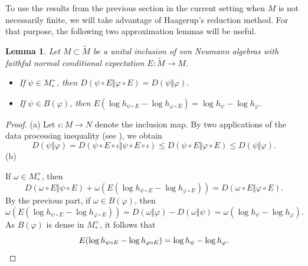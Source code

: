 \documentclass[12pt,a4paper]{amsart}
\newcommand{\1}{\mathds{1}}
\renewcommand{\phi}{\varphi}
\renewcommand{\L}{\mathcal L}
\newcommand{\dom}{\operatorname{dom}}
\theoremstyle{plain}
\newtheorem{lemma}[proposition]{Lemma}
\theoremstyle{definition}
\theoremstyle{remark}
\begin{document}
To use the results from the previous section in the current setting when $M$ is not necessarily finite, we will take advantage of Haagerup's reduction method. For that purpose, the following two approximation lemmas will be useful.

\begin{lemma}\label{lem:entropy_extension}
Let $M\subset \tilde M$ be a unital inclusion of von Neumann algebras with faithful normal conditional expectation $E\colon \tilde M\to M$.
\begin{itemize}
\item[(a)] If $\psi\in M_\ast^+$, then $D(\psi\circ E\Vert \phi\circ E)=D(\psi\Vert \phi)$.

\item[(b)]If $\psi\in B(\phi)$, then $E(\log h_{\psi\circ E}-\log h_{\phi\circ E})=\log h_\psi-\log h_\phi$.
\end{itemize}
\end{lemma}
\begin{proof}
(a) Let $\iota\colon M\to N$ denote the inclusion map. By two applications of the data processing inequality (see \cite[Theorem 4.1]{Hia18}), we obtain
\begin{equation*}
D(\psi\Vert\phi)=D(\psi\circ E\circ\iota\Vert\psi\circ E\circ\iota)\leq D(\psi\circ E\Vert \phi\circ E)\leq D(\psi\Vert\phi).
\end{equation*}
(b) 
If $\omega\in M_\ast^+$, then
\begin{equation*}
D(\omega\circ E\Vert \psi\circ E)+\omega(E(\log h_{\psi\circ E}-\log h_{\phi\circ E}))=D(\omega\circ E\Vert\phi\circ E).
\end{equation*}
By the previous part, if $\omega\in B(\phi)$, then
\begin{equation*}
\omega(E(\log h_{\psi\circ E}-\log h_{\phi\circ E}))=D(\omega\Vert \phi)-D(\omega\Vert \psi)=\omega(\log h_\psi-\log h_\phi).
\end{equation*}
As $B(\phi)$ is dense in $M_\ast^+$, it follows that 
\begin{equation*}
E(\log h_{\psi\circ E}-\log h_{\phi\circ E})=\log h_\psi-\log h_\phi.\qedhere
\end{equation*}
\end{proof}
\end{document}
